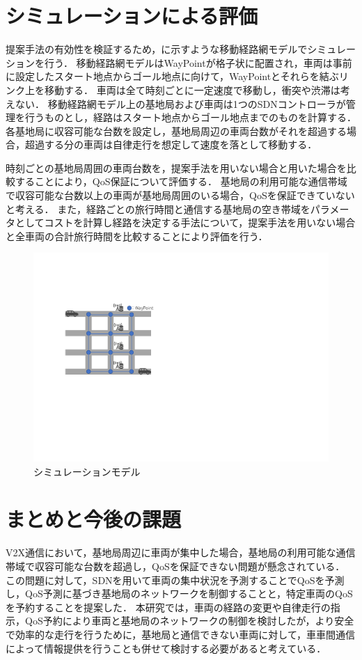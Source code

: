 \documentclass[a4paper,10pt,twocolumn,uplatex]{jsarticle}
\begin{document}
\section{シミュレーションによる評価}
提案手法の有効性を検証するため，に示すような移動経路網モデルでシミュレーションを行う．
移動経路網モデルはWayPointが格子状に配置され，車両は事前に設定したスタート地点からゴール地点に向けて，WayPointとそれらを結ぶリンク上を移動する．
車両は全て時刻ごとに一定速度で移動し，衝突や渋滞は考えない．
移動経路網モデル上の基地局および車両は1つのSDNコントローラが管理を行うものとし，経路はスタート地点からゴール地点までのものを計算する．
各基地局に収容可能な台数を設定し，基地局周辺の車両台数がそれを超過する場合，超過する分の車両は自律走行を想定して速度を落として移動する．\par
時刻ごとの基地局周囲の車両台数を，提案手法を用いない場合と用いた場合を比較することにより，QoS保証について評価する．
基地局の利用可能な通信帯域で収容可能な台数以上の車両が基地局周囲のいる場合，QoSを保証できていないと考える．
また，経路ごとの旅行時間と通信する基地局の空き帯域をパラメータとしてコストを計算し経路を決定する手法について，提案手法を用いない場合と全車両の合計旅行時間を比較することにより評価を行う．

\begin{figure}[t]
	\begin{centering}
    \includegraphics[width=0.84\linewidth]{img/202210_シミュレーションモデル.pdf}
    \caption{シミュレーションモデル}
    \label{fig:model}
    \end{centering}
\end{figure}

\section{まとめと今後の課題}
V2X通信において，基地局周辺に車両が集中した場合，基地局の利用可能な通信帯域で収容可能な台数を超過し，QoSを保証できない問題が懸念されている．
この問題に対して，SDNを用いて車両の集中状況を予測することでQoSを予測し，QoS予測に基づき基地局のネットワークを制御することと，特定車両のQoSを予約することを提案した．
本研究では，車両の経路の変更や自律走行の指示，QoS予約により車両と基地局のネットワークの制御を検討したが，より安全で効率的な走行を行うために，基地局と通信できない車両に対して，車車間通信によって情報提供を行うことも併せて検討する必要があると考えている．
\end{document}
